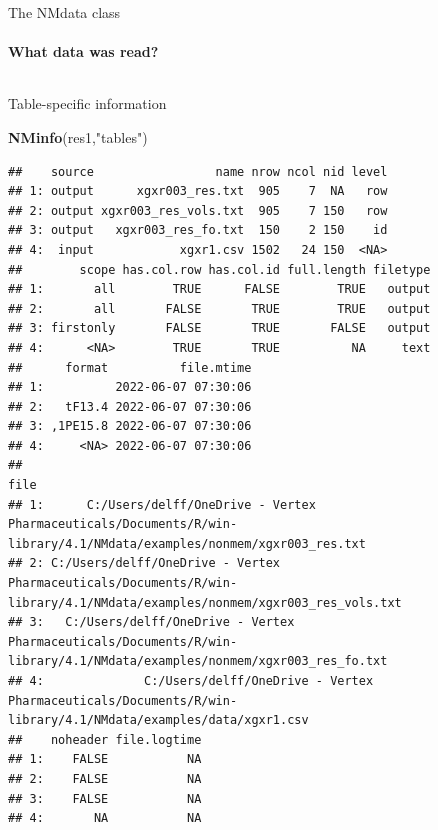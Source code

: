 \documentclass[
  8pt,
  ignorenonframetext,
  aspectratio=169]{beamer}
\newenvironment{Shaded}{\begin{snugshade}}{\end{snugshade}}
\newcommand{\KeywordTok}[1]{\textcolor[rgb]{0.13,0.29,0.53}{\textbf{#1}}}
\newcommand{\NormalTok}[1]{#1}
\newcommand{\StringTok}[1]{\textcolor[rgb]{0.31,0.60,0.02}{#1}}
\begin{document}
\begin{frame}[fragile]{The NMdata class}
\protect\hypertarget{the-nmdata-class-1}{}
\framesubtitle{What data was read?}

\begin{columns}[T]
\begin{column}{0.48\textwidth}
\begin{block}{Table-specific information}
\protect\hypertarget{table-specific-information}{}
\scriptsize

\begin{Shaded}
\begin{Highlighting}[]
\KeywordTok{NMinfo}\NormalTok{(res1,}\StringTok{"tables"}\NormalTok{)}
\end{Highlighting}
\end{Shaded}

\begin{verbatim}
##    source                 name nrow ncol nid level
## 1: output      xgxr003_res.txt  905    7  NA   row
## 2: output xgxr003_res_vols.txt  905    7 150   row
## 3: output   xgxr003_res_fo.txt  150    2 150    id
## 4:  input            xgxr1.csv 1502   24 150  <NA>
##        scope has.col.row has.col.id full.length filetype
## 1:       all        TRUE      FALSE        TRUE   output
## 2:       all       FALSE       TRUE        TRUE   output
## 3: firstonly       FALSE       TRUE       FALSE   output
## 4:      <NA>        TRUE       TRUE          NA     text
##      format          file.mtime
## 1:          2022-06-07 07:30:06
## 2:   tF13.4 2022-06-07 07:30:06
## 3: ,1PE15.8 2022-06-07 07:30:06
## 4:     <NA> 2022-06-07 07:30:06
##                                                                                                                        file
## 1:      C:/Users/delff/OneDrive - Vertex Pharmaceuticals/Documents/R/win-library/4.1/NMdata/examples/nonmem/xgxr003_res.txt
## 2: C:/Users/delff/OneDrive - Vertex Pharmaceuticals/Documents/R/win-library/4.1/NMdata/examples/nonmem/xgxr003_res_vols.txt
## 3:   C:/Users/delff/OneDrive - Vertex Pharmaceuticals/Documents/R/win-library/4.1/NMdata/examples/nonmem/xgxr003_res_fo.txt
## 4:              C:/Users/delff/OneDrive - Vertex Pharmaceuticals/Documents/R/win-library/4.1/NMdata/examples/data/xgxr1.csv
##    noheader file.logtime
## 1:    FALSE           NA
## 2:    FALSE           NA
## 3:    FALSE           NA
## 4:       NA           NA
\end{verbatim}
\end{block}
\end{column}


\end{columns}
\end{frame}
\end{document}
